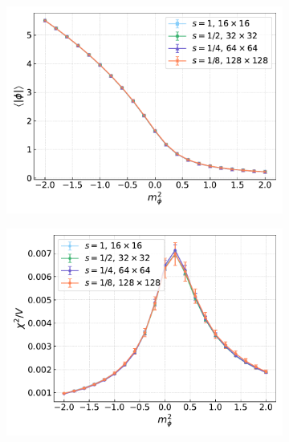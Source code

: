 \begin{figure}[hbp]
    \centering
    \begin{subfigure}[b]{0.48\textwidth}
        \includegraphics[width=1.05\textwidth]{figures/cooling/mass_scan/magnetisation.pdf}
    \end{subfigure}
    \hfill
    \begin{subfigure}[b]{0.48\textwidth}
        \includegraphics[width=1.05\textwidth]{figures/cooling/mass_scan/susceptibility.pdf}
    \end{subfigure}
    \begin{subfigure}[b]{0.48\textwidth}

\end{subfigure}
\end{figure}
